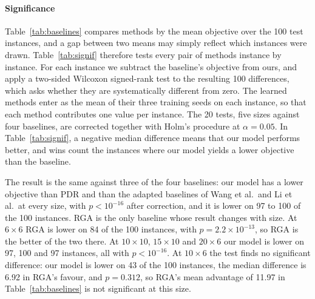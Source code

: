 \paragraph{Significance} Table~\ref{tab:baselines} compares methods by the
mean objective over the 100 test instances, and a gap between two means may
simply reflect which instances were drawn. Table~\ref{tab:signif} therefore
tests every pair of methods instance by instance. For each instance we subtract
the baseline's objective from ours, and apply a two-sided Wilcoxon signed-rank
test to the resulting 100 differences, which asks whether they are
systematically different from zero. The learned methods enter as the mean of
their three training seeds on each instance, so that each method contributes
one value per instance. The 20 tests, five sizes against four baselines, are
corrected together with Holm's procedure at $\alpha=0.05$. In
Table~\ref{tab:signif}, a negative median difference means that our model
performs better, and wins count the instances where our model yields a lower
objective than the baseline.

The result is the same against three of the four baselines: our model has a
lower objective than PDR and than the adapted baselines of Wang et al.\ and
Li et al.\ at every size, with $p<10^{-16}$ after correction, and it is lower
on 97 to 100 of the 100 instances. RGA is the only baseline whose
result changes with size. At $6\times6$ RGA is lower on 84 of the 100
instances, with $p=2.2\times10^{-13}$, so RGA is the better of the two there.
At $10\times10$, $15\times10$ and $20\times6$ our model is lower on 97, 100
and 97 instances, all with $p<10^{-16}$. At $10\times6$ the test finds no
significant difference: our model is lower on 43 of the 100 instances, the
median difference is 6.92 in RGA's favour, and $p=0.312$, so RGA's mean
advantage of 11.97 in Table~\ref{tab:baselines} is not significant at this
size.

